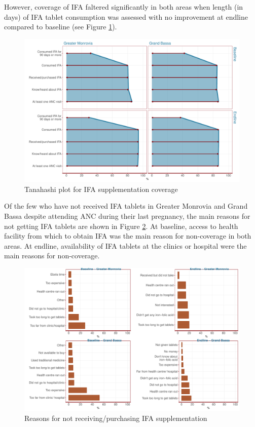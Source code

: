 \documentclass[12pt,a4paper]{article}
\begin{document}
\newpage

However, coverage of IFA faltered significantly in both areas when length (in days) of IFA tablet consumption was assessed with no improvement at endline compared to baseline (see Figure \ref{fig:ifaTanahashiPlot}).

\begin{figure}[H]

{\centering \includegraphics{liberiaCoverageFinalReport_files/figure-latex/ifaTanahashiPlot-1} 

}

\caption{Tanahashi plot for IFA supplementation coverage}\label{fig:ifaTanahashiPlot}
\end{figure}

Of the few who have not received IFA tablets in Greater Monrovia and Grand Bassa despite attending ANC during their last pregnancy, the main reasons for not getting IFA tablets are shown in Figure \ref{fig:ifa2plot}. At baseline, access to health facility from which to obtain IFA was the main reason for non-coverage in both areas. At endline, availability of IFA tablets at the clinics or hospital were the main reasons for non-coverage.

\begin{figure}[H]

{\centering \includegraphics{liberiaCoverageFinalReport_files/figure-latex/ifa2plot-1} 

}

\caption{Reasons for not receiving/purchasing IFA supplementation}\label{fig:ifa2plot}
\end{figure}
\end{document}
